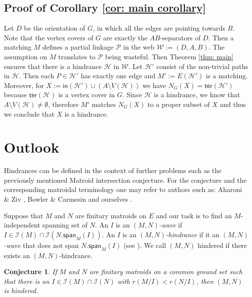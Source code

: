 \documentclass[12pt,a4paper]{amsart}
\theoremstyle{plain}
\newtheorem{conjecture}[theorem]{Conjecture}
\theoremstyle{definition}
\begin{document}
\subsection{Proof of Corollary \ref{cor: main corollary}}
Let $ D $ be the orientation of $ G $, in which all the
edges are pointing towards $ B $. Note that the vertex covers of $ G $ are exactly the $ AB $-separators of $ D $. Then a matching $ M $ defines a 
partial linkage $ \mathcal{P} $ in the web $ \mathcal{W}:=(D,A,B) $. The assumption on $ M $ translates to $ \mathcal{P} 
$ being wasteful.   
Then Theorem \ref{thm: main}  ensures that  there 
 is a hindrance $ \mathcal{H} $ in $ \mathcal{W} $. Let  $ 
\mathcal{H}' $ consist of the non-trivial 
paths in $ \mathcal{H} $. Then each $ P\in \mathcal{H}' $ has exactly one edge and $ 
M':=E(\mathcal{H'}) $ is a matching.  Moreover, for $ X:=\mathsf{in}(\mathcal{H}')\cup (A\setminus V(\mathcal{H})) $ we 
have $ 
N_G(X)=\mathsf{ter}(\mathcal{H}') $ because $ \mathsf{ter}(\mathcal{H}) $ is a vertex cover in $ G $. Since $ 
\mathcal{H} $ is a hindrance, we know that $ A\setminus 
V(\mathcal{H})\neq \emptyset  $, therefore  $ 
M' $ matches $ N_{G}(X) $ to a proper subset of $ X $ and thus we conclude that $ X $ is a hindrance.
\section{Outlook}\label{sec: outlook}
Hindrances can be defined in the context of further problems such as the previously mentioned Matroid intersection 
conjecture. For the 
conjecture and the 
corresponding matroidal terminology one may refer to authors such as:  Aharoni \& Ziv \cite{aharoni1998intersection}, 
Bowler \& Carmesin 
\cite{bowler2015matroid} and ourselves 
\cite{joo2021MIC}.   

Suppose that $ M $ and 
$ N $ are finitary matroids on $ E $ and our task is to find an $ M 
$-independent spanning set of $ N $. An $ I $ is an  $ (M,N) $\emph{-wave} if  $I\in \mathcal{I}(M)\cap 
\mathcal{I}(N.\mathsf{span}_M(I)) $.  An $ I $ is an $ (M,N) $\emph{-hindrance} if it an $ (M,N) $\emph{-wave}
that does not span $ N.\mathsf{span}_M(I) $ (see \cite[Definition 3.2]{aharoni1998intersection}). We call $ (M,N) $ 
hindered if there exists an $ (M,N) $-hindrance.

\begin{conjecture}
If $ M $ and $ N $ are finitary matroids on a common ground set such that  there is an $ I\in \mathcal{I}(M) \cap 
\mathcal{I}(N) $ with $ r(M/I)<r(N/I) $, then $ (M,N)$ is hindered.
\end{conjecture}
\end{document}
